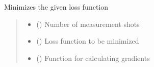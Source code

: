 \documentclass[letterpaper,10pt,english]{sphinxmanual}
\begin{document}
\begin{fulllineitems}
\begin{fulllineitems}
\label{\detokenize{qcompute_qapp.optimizer:qcompute_qapp.optimizer.Powell.minimize}}
\pysigstartsignatures
{}
\pysigstopsignatures
\sphinxAtStartPar
Minimizes the given loss function
\begin{quote}\begin{description}
\begin{itemize}
\item {} 
\sphinxAtStartPar
{} () \textendash{} Number of measurement shots

\item {} 
\sphinxAtStartPar
{} (\sphinxstyleliteralemphasis{\sphinxupquote{{[}}}\sphinxstyleliteralemphasis{\sphinxupquote{{[}}}\sphinxstyleliteralemphasis{\sphinxupquote{, }}\sphinxstyleliteralemphasis{\sphinxupquote{{]}}}\sphinxstyleliteralemphasis{\sphinxupquote{, }}\sphinxstyleliteralemphasis{\sphinxupquote{{]}}}) \textendash{} Loss function to be minimized

\item {} 
\sphinxAtStartPar
{} (\sphinxstyleliteralemphasis{\sphinxupquote{{[}}}\sphinxstyleliteralemphasis{\sphinxupquote{{[}}}\sphinxstyleliteralemphasis{\sphinxupquote{, }}\sphinxstyleliteralemphasis{\sphinxupquote{{]}}}\sphinxstyleliteralemphasis{\sphinxupquote{, }}\sphinxstyleliteralemphasis{\sphinxupquote{{]}}}\sphinxstyleliteralemphasis{\sphinxupquote{)}}) \textendash{} Function for calculating gradients

\end{itemize}

\end{description}\end{quote}

\end{fulllineitems}


\end{fulllineitems}
\end{document}
